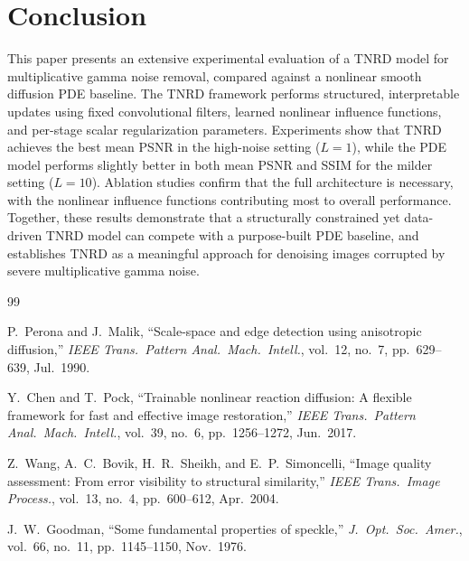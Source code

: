 \documentclass[conference]{IEEEtran}
\begin{document}
\section{Conclusion}
This paper presents an extensive experimental evaluation of a TNRD model for
multiplicative gamma noise removal, compared against a nonlinear smooth diffusion
PDE baseline. The TNRD framework performs structured, interpretable updates using
fixed convolutional filters, learned nonlinear influence functions, and per-stage
scalar regularization parameters. Experiments show that TNRD achieves the best
mean PSNR in the high-noise setting ($L=1$), while the PDE model performs slightly
better in both mean PSNR and SSIM for the milder setting ($L=10$). Ablation studies
confirm that the full architecture is necessary, with the nonlinear influence
functions contributing most to overall performance. Together, these results
demonstrate that a structurally constrained yet data-driven TNRD model can compete
with a purpose-built PDE baseline, and establishes TNRD as a meaningful approach
for denoising images corrupted by severe multiplicative gamma noise.

\begin{thebibliography}{99}

P.~Perona and J.~Malik,
``Scale-space and edge detection using anisotropic diffusion,''
\emph{IEEE Trans.\ Pattern Anal.\ Mach.\ Intell.},
vol.~12, no.~7, pp.~629--639, Jul.\ 1990.

Y.~Chen and T.~Pock,
``Trainable nonlinear reaction diffusion: A flexible framework for fast and
effective image restoration,''
\emph{IEEE Trans.\ Pattern Anal.\ Mach.\ Intell.},
vol.~39, no.~6, pp.~1256--1272, Jun.\ 2017.

Z.~Wang, A.~C.~Bovik, H.~R.~Sheikh, and E.~P.~Simoncelli,
``Image quality assessment: From error visibility to structural similarity,''
\emph{IEEE Trans.\ Image Process.},
vol.~13, no.~4, pp.~600--612, Apr.\ 2004.

J.~W.~Goodman,
``Some fundamental properties of speckle,''
\emph{J.\ Opt.\ Soc.\ Amer.},
vol.~66, no.~11, pp.~1145--1150, Nov.\ 1976.

\end{thebibliography}
\end{document}
